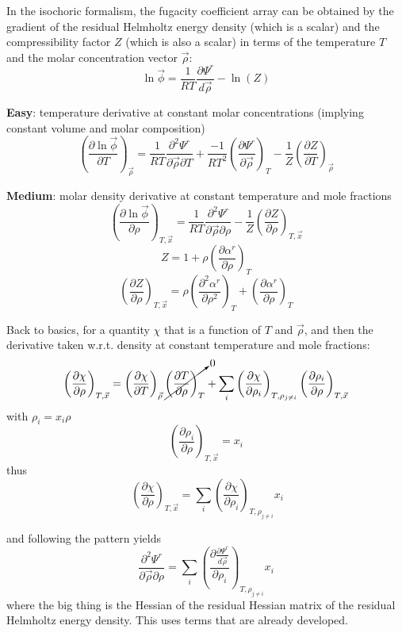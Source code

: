 \documentclass{article}
\newcommand{\deriv}[3]{\ensuremath{\left(\frac{\partial #1}{\partial #2}\right)_{#3}}}
\begin{document}
In the isochoric formalism, the fugacity coefficient array can be obtained by the gradient of the residual Helmholtz energy density (which is a scalar) and the compressibility factor $Z$  (which is also a scalar) in terms of the temperature $T$ and the molar concentration vector $\vec\rho$:
\begin{equation}
	\ln\vec\phi = \frac{1}{RT}\frac{\partial \Psi^r}{d\vec\rho} - \ln(Z)
\end{equation}

\textbf{Easy}: temperature derivative at constant molar concentrations (implying constant volume and molar composition)
\begin{equation}
	\deriv{ \ln\vec\phi}{T}{\vec\rho} = \frac{1}{RT}\frac{\partial^2 \Psi^r}{\partial \vec\rho\partial T} + \frac{-1}{RT^2}\deriv{\Psi^r}{\vec\rho}{T} - \frac{1}{Z}\deriv{Z}{T}{\vec\rho}
\end{equation}

\textbf{Medium}: molar density derivative at constant temperature and mole fractions
\begin{equation}
	\deriv{ \ln\vec\phi}{\rho}{T,\vec x} = \frac{1}{RT}\frac{\partial^2 \Psi^r}{\partial \vec\rho\partial \rho}  - \frac{1}{Z}\deriv{Z}{\rho}{T,\vec x}
\end{equation}
\begin{equation}
	Z = 1+\rho\deriv{\alpha^r}{\rho}{T}
\end{equation}
\begin{equation}
\deriv{Z}{\rho}{T,\vec x} = \rho\deriv{^2\alpha^r}{\rho^2}{T} + \deriv{\alpha^r}{\rho}{T}
\end{equation}

Back to basics, for a quantity $\chi$ that is a function of $T$ and $\vec\rho$, and then the derivative taken w.r.t. density at constant temperature and mole fractions:
\begin{equation}
	\deriv{\chi}{\rho}{T, \vec x} = 	\deriv{\chi}{T}{\vec \rho}\cancelto{0}{\deriv{T}{\rho}{T}} + \sum_i\deriv{\chi}{\rho_i}{T, \rho_{j\neq i}}\deriv{\rho_i}{\rho}{T,\vec x}
\end{equation}
with $\rho_i =x_i\rho$
\begin{equation}
\deriv{\rho_i}{\rho}{T, \vec x} = x_i
\end{equation}
thus
\begin{equation}\
	\deriv{\chi}{\rho}{T, \vec x} =  \sum_i\deriv{\chi}{\rho_i}{T, \rho_{j\neq i}}x_i
\end{equation}

and following the pattern yields
\begin{equation}
\frac{\partial^2 \Psi^r}{\partial \vec\rho\partial \rho} = 	\sum_i\deriv{\frac{\partial \Psi^r}{d\vec\rho} }{\rho_i}{T, \rho_{j\neq i}}x_i
\end{equation}
where the big thing is the Hessian of the residual Hessian matrix of the residual Helmholtz energy density.  This uses terms that are already developed.
\end{document}
